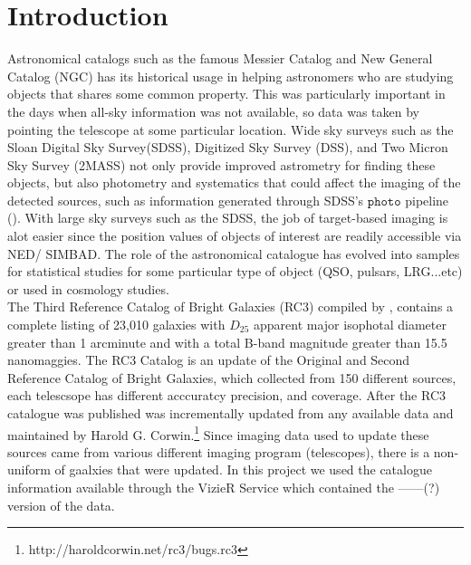 \documentclass[5p]{elsarticle}
\begin{document}
\section{Introduction}
Astronomical catalogs such as the famous Messier Catalog and New General Catalog (NGC) has its historical usage in helping  astronomers who are studying objects that shares some common property. This was particularly important in the days when all-sky information was not available, so data was taken by pointing the telescope at some particular location.  
Wide sky surveys such as the Sloan Digital Sky Survey(SDSS), Digitized Sky Survey (DSS), and Two Micron Sky Survey (2MASS) not only provide improved astrometry for finding these objects, but also photometry and systematics  that could affect the imaging of the detected sources, such as information generated through SDSS's $\texttt{photo}$ pipeline (\citet{photopaper}).
With large sky surveys such as the SDSS, the job of target-based imaging is alot easier since the position values of objects of interest are readily accessible via NED/ SIMBAD. The role of the astronomical catalogue has evolved into samples for statistical studies for some particular type of object (QSO, pulsars, LRG...etc) or used in cosmology studies.
\\
\indent 
The Third Reference Catalog of Bright Galaxies (RC3) compiled by \citet{rc3}, contains a  complete listing of 23,010 galaxies with $D_25$ apparent major isophotal diameter  greater than 1 arcminute and with a total B-band magnitude greater than 15.5 nanomaggies.
The RC3 Catalog is an update of the Original and Second Reference Catalog of Bright Galaxies, which collected from 150 different sources, each telescsope has different acccuratcy precision, and coverage. After the RC3 catalogue was published was incrementally updated from any available data and maintained by Harold G. Corwin.\footnote{http://haroldcorwin.net/rc3/bugs.rc3} Since imaging data used to update these sources came from various different imaging program (telescopes), there is a non-uniform of gaalxies that were updated. In this project we used the catalogue information available through the VizieR Service  which contained the ------(?) version of the data.
\\
\end{document}
